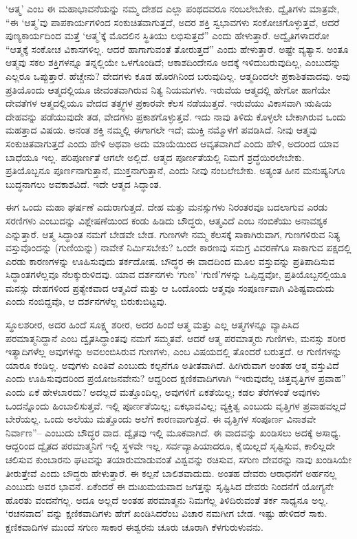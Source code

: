 ‘ಆತ್ಮ’ ಎಂಬ ಈ ಮಹಾಭಾವನೆಯನ್ನು ನಮ್ಮ ದೇಶದ ಎಲ್ಲಾ ಪಂಥದವರೂ ನಂಬಲೇಬೇಕು. ದ್ವೈತಿಗಳು ಮಾತ್ರವೇ, “ಈ ‘ಆತ್ಮ’ವು ಪಾಪಕಾರ್ಯಗಳಿಂದ ಸಂಕುಚಿತವಾಗುತ್ತದೆ, ಅದರ ಶಕ್ತಿ ಸ್ವಭಾವಗಳು ಸಂಕೋಚಗೊಳ್ಳುತ್ತವೆ, ಆದರೆ ಪುಣ್ಯಕಾರ್ಯದಿಂದ ಮತ್ತೆ ‘ಆತ್ಮ’ಕ್ಕೆ ಮೊದಲಿನ ಸ್ಥಿತಿಯು ಲಭಿಸುತ್ತದೆ” ಎಂದು ಹೇಳುತ್ತಾರೆ. ಅದ್ವೈತಿಗಳಾದರೋ “ಆತ್ಮಕ್ಕೆ ಸಂಕೋಚ ವಿಕಾಸಗಳಿಲ್ಲ. ಆದರೆ ಹಾಗಾಗುವಂತೆ ತೋರುತ್ತದೆ” ಎಂದು ಹೇಳುತ್ತಾರೆ. ಅಷ್ಟೇ ವ್ಯತ್ಯಾಸ. ಅಂತೂ ಆತ್ಮವು ಸಕಲ ಶಕ್ತಿಗಳನ್ನೂ ತನ್ನಲ್ಲಿಯೇ ಒಳಗೊಂಡಿದೆ; ಆಕಾಶದಿಂದೇನೂ ಅದಕ್ಕೆ ಇಳಿದುಬರುವುದಿಲ್ಲ, ಎಂಬುದನ್ನು ಎಲ್ಲರೂ ಒಪ್ಪುತ್ತಾರೆ. ಹೆಚ್ಚೇನು? ವೇದಗಳು ಕೂಡ ಹೊರಗಿನಿಂದ ಬರುವುದಿಲ್ಲ. ಆತ್ಮದಿಂದಲೇ ಪ್ರಕಾಶಿತವಾದವು. ಅವು ಪ್ರತಿಯೊಂದು ಆತ್ಮದಲ್ಲಿಯೂ ಜೀವಂತವಾಗಿರುವ ನಿತ್ಯ ನಿಯಮಗಳು. ಇರುವೆಯ ಆತ್ಮದಲ್ಲಿ ಹೇಗೋ ಹಾಗೆಯೇ ದೇವತೆಗಳ ಆತ್ಮದಲ್ಲಿಯೂ ವೇದದ ತತ್ತ್ವಗಳ ಪ್ರಕಾರವೇ ಕೆಲಸ ನಡೆಯುತ್ತದೆ. ಇರುವೆಯು ವಿಕಾಸವಾಗಿ ಋಷಿಯ ದೇಹವನ್ನು ಪಡೆಯುವುದೇ ತಡ, ವೇದಗಳು ಪ್ರಕಾಶಗೊಳ್ಳುತ್ತವೆ. ಇದು ನಾವು ತಿಳಿದು ಕೊಳ್ಳಲೇ ಬೇಕಾಗಿರುವ ಒಂದು ಮಹತ್ತಾದ ವಿಷಯ. ಅನಂತ ಶಕ್ತಿ ನಮ್ಮಲ್ಲಿ ಈಗಾಗಲೇ ಇದೆ; ಮುಕ್ತಿ ನಮ್ಮೊಳಗೆ ಪವಡಿಸಿದೆ. ನೀವು ಆತ್ಮವು ಸಂಕುಚಿತವಾಗುತ್ತದೆ ಎಂದು ಹೇಳಿ ಅಥವಾ ಅದು ಮಾಯೆಯಿಂದ ಆವೃತವಾಗಿದೆ ಎಂದು ಹೇಳಿ, ಅದರಿಂದ ಯಾವ ಬಾಧೆಯೂ ಇಲ್ಲ. ಪರಿಪೂರ್ಣತೆ ಆಗಲೇ ಅಲ್ಲಿದೆ. ಆತ್ಮದ ಪೂರ್ಣತೆಯಲ್ಲಿ ನಿಮಗೆ ಶ್ರದ್ಧೆಯಿರಲೇಬೇಕು. ಪ್ರತಿಯೊಬ್ಬನೂ ಪೂರ್ಣನಾಗುತ್ತಾನೆ, ಮುಕ್ತನಾಗುತ್ತಾನೆ, ಎಂದು ನೀವು ನಂಬಲೇಬೇಕು. ಅತ್ಯಂತ ಹೀನ ಮನುಷ್ಯನಿಗೂ ಬುದ್ಧನಾಗಲು ಅವಕಾಶವಿದೆ. ಇದೇ ಆತ್ಮದ ಸಿದ್ಧಾಂತ. 

ಈಗ ಒಂದು ಮಹಾ ಘರ್ಷಣೆ ಎದುರಾಗುತ್ತದೆ. ದೇಹ ಮತ್ತು ಮನಸ್ಸುಗಳು ನಿರಂತರವೂ ಬದಲಾಗುವ ಎರಡು ಸರಣಿಗಳು ಎಂಬುದನ್ನು ವಿಶ್ಲೇಷಣೆಯಿಂದ ಕಂಡು ಹಿಡಿದು ಬೌದ್ಧರು, ಆತ್ಮವಿದೆ ಎಂಬ ನಂಬಿಕೆಯು ಅನಾವಶ್ಯಕ ಎನ್ನುತ್ತಾರೆ. ಆತ್ಮ ಸಿದ್ಧಾಂತ ನಮಗೆ ಬೇಡವೇ ಬೇಡ. ಗುಣಗಳೇ ನಮ್ಮ ಕೆಲಸಕ್ಕೆ ಸಾಕಾಗಿರುವಾಗ, ಗುಣಗಳಿರುವ ನಿತ್ಯ ವಸ್ತುವೊಂದನ್ನು (ಗುಣಿಯನ್ನು) ನಾವೇಕೆ ನಿರ್ಮಿಸಬೇಕು? ಒಂದೇ ಕಾರಣವು ಸಮಗ್ರ ವಿವರಣೆಗೂ ಸಾಕಾಗುವ ಪಕ್ಷದಲ್ಲಿ ಎರಡು ಕಾರಣಗಳನ್ನು ಊಹಿಸುವುದು ತರ್ಕದೋಷ. ಬೌದ್ಧರ ಈ ವಾದದಿಂದ ಮೂಲ ವಸ್ತುವನ್ನು ಪ್ರತಿಪಾದಿಸುವ ಸಿದ್ಧಾಂತಗಳೆಲ್ಲವೂ ನೆಲಕ್ಕುರುಳಿದವು. ಯಾವ ದರ್ಶನಗಳು ‘ಗುಣ’ ‘ಗುಣಿ’ಗಳನ್ನು ಒಪ್ಪಿದ್ದವೋ, ಪ್ರತಿಯೊಬ್ಬನಲ್ಲಿಯೂ ಮನಸ್ಸು ದೇಹಗಳಿಂದ ಪ್ರತ್ಯೇಕವಾದ ಆತ್ಮವಿದೆ ಮತ್ತು ಆ ಒಂದೊಂದು ಆತ್ಮವೂ ಸಂಪೂರ್ಣವಾಗಿ ವಿಶಿಷ್ಟವಾದುದು ಎಂದು ನಂಬಿದ್ದವೊ, ಆ ದರ್ಶನಗಳೆಲ್ಲ ಬಿರುಕುಬಿಟ್ಟವು. 

ಸ್ಥೂಲಶರೀರ, ಅದರ ಹಿಂದೆ ಸೂಕ್ಷ್ಮ ಶರೀರ, ಅದರ ಹಿಂದೆ ಆತ್ಮ ಮತ್ತು ಎಲ್ಲ ಆತ್ಮಗಳನ್ನೂ ವ್ಯಾಪಿಸಿದ ಪರಮಾತ್ಮನಿದ್ದಾನೆ ಎಂಬ ದ್ವೈತಸಿದ್ಧಾಂತವು ನಮಗೆ ಸಮ್ಮತವೆ. ಆದರೆ ಆತ್ಮ ಪರಮಾತ್ಮರು ಗುಣಿಗಳು, ಮನಸ್ಸು ಶರೀರ ಇತ್ಯಾದಿಗಳೆಲ್ಲ ಅವುಗಳನ್ನು ಅವಲಂಬಿಸಿರುವ ಗುಣಗಳು, ಎಂಬ ವಿಷಯದಲ್ಲಿ ತೊಂದರೆ ಬರುತ್ತದೆ. ಆ ಗುಣಿಗಳನ್ನು ಯಾರೂ ಕಂಡಿಲ್ಲ. ಅವುಗಳು ಎಂತಿವೆ ಎಂಬುದು ಕಲ್ಪನೆಗೂ ಅತೀತವಾಗಿದೆ. ಹೀಗಿರುವಾಗ ಅಂತಹ ಆತ್ಮ ವಸ್ತುವಿದೆ ಎಂದು ಊಹಿಸುವುದರಿಂದ ಪ್ರಯೋಜನವೇನು? ಆದ್ದರಿಂದ ಕ್ಷಣಿಕವಾದಿಗಳಾಗಿ “ಇರುವುದೆಲ್ಲ ಚಿತ್ತವೃತ್ತಿಗಳ ಪ್ರವಾಹ” ಎಂದು ಏಕೆ ಹೇಳಬಾರದು? ಅದಲ್ಲದೆ ಮತ್ತೊಂದಿಲ್ಲ, ಅವುಗಳಿಗೆ ಏಕತೆಯಿಲ್ಲ; ಕಡಲ ತೆರೆಗಳಂತೆ ಅವುಗಳು ಒಂದನ್ನೊಂದು ಹಿಂಬಾಲಿಸುತ್ತವೆ. ಇಲ್ಲಿ ಪೂರ್ಣತೆಯಿಲ್ಲ; ಏಕಭಾವವಿಲ್ಲ; ವ್ಯಕ್ತಿತ್ವ ಎಂಬುದು ವೃತ್ತಿಗಳ ಪ್ರವಾಹವಲ್ಲದೆ ಬೇರೆಯಲ್ಲ. ಒಂದು ಅಲೆಯು ಮತ್ತೊಂದು ಅಲೆಗೆ ಕಾರಣವಾಗುತ್ತದೆ. ಈ ವೃತ್ತಿಗಳ ಸಂಪೂರ್ಣ ವಿನಾಶವೇ ನಿರ್ವಾಣ”– ಎಂಬುದು ಬೌದ್ಧರ ವಾದ. ದ್ವೈತವು ಇಲ್ಲಿ ಮೂಕವಾಗಿದೆ. ಈ ವಾದವನ್ನು ಖಂಡಿಸಲು ಅದಕ್ಕೆ ಅಸಾಧ್ಯ. ಆದ್ದರಿಂದ ದ್ವೈತದ ಪರಮಾತ್ಮನಿಗೆ ಇಲ್ಲಿ ಸ್ಥಳವೇ ಇಲ್ಲ. ಸರ್ವವ್ಯಾಪಿಯಾದರೂ, ಕೈಯಿಲ್ಲದೆ ಸೃಷ್ಟಿಸುವ, ಕಾಲಿಲ್ಲದೇ ಚಲಿಸುವ ಕುಂಬಾರನು ಘಟವನ್ನು ತಯಾರುಮಾಡುವಂತೆ ವಿಶ್ವವನ್ನು ರಚಿಸುವ, ಸಗುಣ ದೇವರನ್ನು ನಾವು ಖಂಡಿಸಿಯೇ ತೀರುತ್ತೇವೆ ಎಂದು ಬೌದ್ಧರು ಹೇಳುತ್ತಾರೆ. ಈ ಕಲ್ಪನೆ ಬಾಲಿಶವಾದುದು. ಅಂತಹ ದೇವರು ಆರಾಧನೆಗೆ ಅರ್ಹನಲ್ಲ ಎಂಬುದು ಅವರ ಭಾವನೆ. ಏಕೆಂದರೆ ಈ ದುಃಖಮಯವಾದ ಜಗತ್ತನ್ನು ಸೃಷ್ಟಿಸಿದ ದೇವರು ನಿಂದನೆಗೆ ಯೋಗ್ಯನೇ ಹೊರತು ವಂದನೆಗಲ್ಲ. ಅದೂ ಅಲ್ಲದೆ ಅಂತಹ ಪರಮಾತ್ಮನು ನಿಮಗೆಲ್ಲ ತಿಳಿದಿರುವಂತೆ ತರ್ಕ ಸಾಧ್ಯನೂ ಅಲ್ಲ. ‘ರಚನವಾದ’  ವನ್ನು ಕ್ಷಣಿಕವಾದಿಗಳು ಹೇಗೆ ಖಂಡಿಸಿದರೆಂಬ ವಿಚಾರ ನಮಗೀಗ ಬೇಡ. ಇಷ್ಟು ಹೇಳಿದರೆ ಸಾಕು. ಕ್ಷಣಿಕವಾದಿಗಳ ಮುಂದೆ ಸಗುಣ ಸಾಕಾರ ಈಶ್ವರನು ಚೂರು ಚೂರಾಗಿ ಕೆಳಗುರುಳುವನು. 

